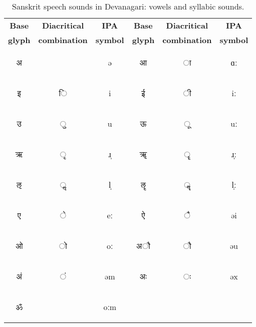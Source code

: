 \documentclass[10pt,a4paper]{article}
\newcommand{\sansk}[1]{\begin{sanskrit}#1\end{sanskrit}}
\begin{document}
\begin{table*}[ht]
	\begin{center}
		\begin{tabular}{|c|c|c||c|c|c|}
			\hline
			\textbf{Base}&\textbf{Diacritical}&\textbf{IPA}&\textbf{Base} &\textbf{Diacritical}&\textbf{IPA} \\
			\textbf{glyph}& \textbf{combination}&\textbf{symbol}&\textbf{glyph}& \textbf{combination}&{\bf symbol}\\\hline%
			
			\sansk{अ}&&ə& \sansk{आ}& \sansk{ा}&ɑː\\\hline
			\sansk{इ}& \sansk{ि}&i&	\sansk{ई}& \sansk{ी}&iː\\\hline
			\sansk{उ}&\sansk{ ु}&u&
			\sansk{ऊ}& \sansk{ ू}&uː\\\hline
			\sansk{ऋ}&\sansk{ ृ}&ɹ̩&\sansk{ॠ} &\sansk{ ॄ}&ɹ̩ː\\\hline
			\sansk{ऌ}&\sansk{	ॢ}&l̩&\sansk{ॡ} &\sansk{ॣ}&l̩ː\\\hline
			\sansk{ए}&\sansk{ े}&eː& \sansk{ऐ} & \sansk{	ै}&əi\\\hline
			\sansk{ओ}& 	\sansk{ो }&oː&	\sansk{	अाै}&\sansk{ाै}&  əu\\\hline
			\sansk{अं}& \sansk{	ं }&əm&	\sansk{अः}&	\sansk{ः} & əx\\\hline
			\sansk{ॐ} &&oːm&&&%
			\\\hline
			
		\end{tabular}
		\caption{Sanskrit speech sounds in Devanagari: vowels and syllabic sounds.}
	\end{center}
	\label{vow}
\end{table*}

\end{document}
